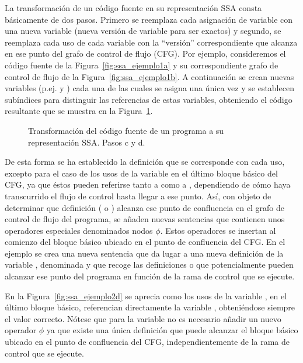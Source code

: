 La transformación de un código fuente en su representación SSA consta básicamente de dos pasos. Primero se reemplaza cada asignación de variable con una nueva variable (nueva versión de variable para ser exactos) y segundo, se reemplaza cada uso de cada variable con la ``versión''  correspondiente que alcanza en ese punto del grafo de control de flujo (CFG). Por ejemplo, consideremos el código fuente de la Figura~\ref{fig:ssa_ejemplo1a} y su correspondiente grafo de control de flujo de la Figura~\ref{fig:ssa_ejemplo1b}. A continuación se crean nuevas variables (p.ej.  y ) cada una de las cuales se asigna una única vez y se establecen subíndices para distinguir las referencias de estas variables, obteniendo el código resultante que se muestra en la Figura~\ref{fig:ssa_ejemplo2}.
%
\begin{figure}[t]
\begin{center}
\setcounter{subfigure}{2}
%
\caption{Transformación del código fuente de un programa a su representación SSA. Pasos c y d.}
\label{fig:ssa_ejemplo2}
\end{center}
\end{figure}
%
De esta forma se ha establecido la definición que se corresponde con cada uso, excepto para el caso de los usos de la variable  en el último bloque básico del CFG, ya que éstos pueden referirse tanto a  como a , dependiendo de cómo haya transcurrido el flujo de control hasta llegar a ese punto.
Así, con objeto de determinar que definición ( o ) alcanza ese punto de confluencia en el grafo de control de flujo del programa, se añaden nuevas sentencias que contienen unos operadores especiales denominados nodos $\phi$. Estos operadores se insertan al comienzo del bloque básico ubicado en el punto de confluencia del CFG. En el ejemplo se crea una nueva sentencia  que da lugar a una nueva definición de la variable , denominada  y que recoge las definiciones  o  que potencialmente pueden alcanzar ese punto del programa en función de la rama de control que se ejecute.

En la Figura~\ref{fig:ssa_ejemplo2d} se aprecia como los usos de la variable , en el último bloque básico, referencian directamente la variable , obteniéndose siempre el valor correcto. Nótese que para la variable  no es necesario añadir un nuevo operador $\phi$ ya que existe una única definición  que puede alcanzar el bloque básico ubicado en el punto de confluencia del CFG, independientemente de la rama de control que se ejecute.


